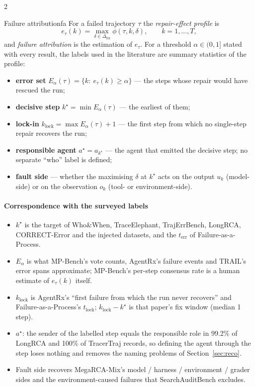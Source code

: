 \begin{multicols}{2}
\begin{definition}{Failure attribution}{fa}
For a failed trajectory $\tau$ the \emph{repair-effect profile} is
\[e_\tau(k)=\max_{\delta\in\Delta_{\mathrm{fix}}}\phi(\tau,k,\delta),\qquad k=1,\dots,T,\]
and \emph{failure attribution} is the estimation of $e_\tau$. For a threshold $\alpha\in(0,1]$ stated with every result, the labels used in the literature are summary statistics of the profile:
\begin{itemize}[leftmargin=1.1em]
\item \textbf{error set} $E_\alpha(\tau)=\{k:\ e_\tau(k)\ge\alpha\}$ --- the steps whose repair would have rescued the run;
\item \textbf{decisive step} $k^\star=\min E_\alpha(\tau)$ --- the earliest of them;
\item \textbf{lock-in} $k_{\mathrm{lock}}=\max E_\alpha(\tau)+1$ --- the first step from which no single-step repair recovers the run;
\item \textbf{responsible agent} $a^\star=a_{k^\star}$ --- the agent that emitted the decisive step; no separate ``who'' label is defined;
\item \textbf{fault side} --- whether the maximising $\delta$ at $k^\star$ acts on the output $u_k$ (model-side) or on the observation $o_k$ (tool- or environment-side).
\end{itemize}
\end{definition}

\paragraph{Correspondence with the surveyed labels}
\begin{itemize}[leftmargin=1.1em]
\item $k^\star$ is the target of Who\&When, TraceElephant, TrajErrBench, LongRCA, CORRECT-Error and the injected datasets, and the $t_{\mathrm{err}}$ of Failure-as-a-Process.
\item $E_\alpha$ is what MP-Bench's vote counts, AgentRx's failure events and TRAIL's error spans approximate; MP-Bench's per-step consensus rate is a human estimate of $e_\tau(k)$ itself.
\item $k_{\mathrm{lock}}$ is AgentRx's ``first failure from which the run never recovers'' and Failure-as-a-Process's $t_{\mathrm{lock}}$; $k_{\mathrm{lock}}-k^\star$ is that paper's fix window (median 1 step).
\item $a^\star$: the sender of the labelled step equals the responsible role in 99.2\% of LongRCA and 100\% of TracerTraj records, so defining the agent through the step loses nothing and removes the naming problems of Section~\ref{sec:reco}.
\item Fault side recovers MegaRCA-Mix's model / harness / environment / grader sides and the environment-caused failures that SearchAuditBench excludes.
\end{itemize}


\end{multicols}
